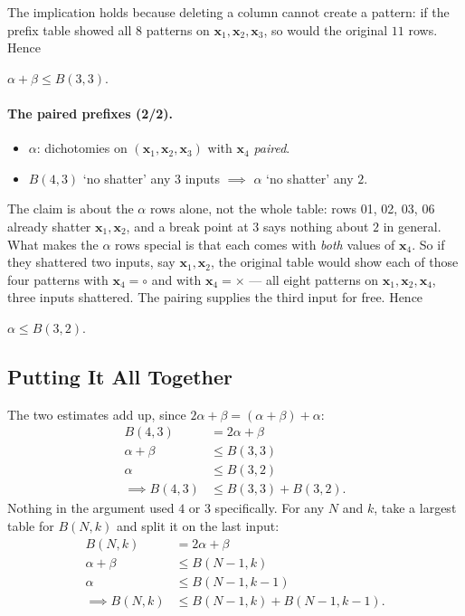 The implication holds because deleting a column cannot create a pattern: if
the prefix table showed all \(8\) patterns on \(\bm{x}_1, \bm{x}_2, \bm{x}_3\),
so would the original \(11\) rows. Hence

\begin{moral}
    \(\alpha + \beta \le B(3, 3)\).
\end{moral}

\paragraph{The paired prefixes (2/2).}

\begin{itemize}
    \item \(\alpha\): dichotomies on \((\bm{x}_1, \bm{x}_2, \bm{x}_3)\) with
        \(\bm{x}_4\) \emph{paired}.
    \item \(B(4, 3)\) `no shatter' any \(3\) inputs \(\implies\) \(\alpha\)
        `no shatter' any \(2\).
\end{itemize}

The claim is about the \(\alpha\) rows alone, not the whole table: rows 01,
02, 03, 06 already shatter \(\bm{x}_1, \bm{x}_2\), and a break point at \(3\)
says nothing about \(2\) in general. What makes the \(\alpha\) rows special is
that each comes with \emph{both} values of \(\bm{x}_4\). So if they shattered
two inputs, say \(\bm{x}_1, \bm{x}_2\), the original table would show each of
those four patterns with \(\bm{x}_4 = \circ\) and with \(\bm{x}_4 = \times\)
--- all eight patterns on \(\bm{x}_1, \bm{x}_2, \bm{x}_4\), three inputs
shattered. The pairing supplies the third input for free. Hence

\begin{moral}
    \(\alpha \le B(3, 2)\).
\end{moral}

\subsection{Putting It All Together}

The two estimates add up, since \(2\alpha + \beta = (\alpha + \beta) +
\alpha\):
\begin{align*}
    B(4, 3) &= 2\alpha + \beta\\
    \alpha + \beta &\le B(3, 3)\\
    \alpha &\le B(3, 2)\\
    \implies B(4, 3) &\le B(3, 3) + B(3, 2) .
\end{align*}
Nothing in the argument used \(4\) or \(3\) specifically. For any \(N\) and
\(k\), take a largest table for \(B(N, k)\) and split it on the last input:
\begin{align*}
    B(N, k) &= 2\alpha + \beta\\
    \alpha + \beta &\le B(N - 1, k)\\
    \alpha &\le B(N - 1, k - 1)\\
    \implies B(N, k) &\le B(N - 1, k) + B(N - 1, k - 1) .
\end{align*}

